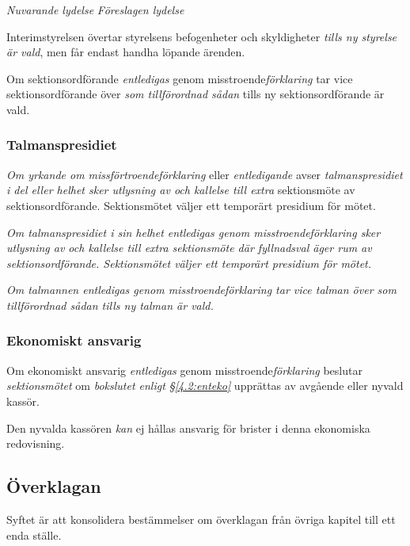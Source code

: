 \documentclass{article}
\newenvironment{lydelse}
    {\begin{paracol}{2}%
        \emph{Nuvarande lydelse}%
        \switchcolumn%
        \emph{Föreslagen lydelse}%
    \end{paracol}%
    \begin{enumerate}[label=\thesubsection.\arabic*]%
    \begin{paracol}{2}%
    }{\end{paracol}\end{enumerate}}
\begin{document}
\begin{lydelse}
    \item Interimstyrelsen övertar styrelsens befogenheter och skyldigheter \emph{tills ny styrelse är vald}, men får endast handha löpande ärenden.

    \item Om sektionsordförande \emph{entledigas} genom misstroende\emph{förklaring} tar vice sektionsordförande över \emph{som tillförordnad sådan} tills ny sektionsordförande är vald.

    \subsubsection*{Talmanspresidiet}
    \item \emph{Om yrkande om missförtroendeförklaring} eller \emph{entledigande} avser \emph{talmanspresidiet i del eller helhet sker utlysning av och kallelse till extra} sektionsmöte av sektionsordförande.
    Sektionsmötet väljer ett temporärt presidium för mötet.

    \item \emph{Om talmanspresidiet i sin helhet entledigas genom misstroendeförklaring sker utlysning av och kallelse till extra sektionsmöte där fyllnadsval äger rum av sektionsordförande.
    Sektionsmötet väljer ett temporärt presidium för mötet.}

    \item \emph{Om talmannen entledigas genom misstroendeförklaring tar vice talman över som tillförordnad sådan tills ny talman är vald.}
      
    \subsubsection*{Ekonomiskt ansvarig}
    \item Om ekonomiskt ansvarig \emph{entledigas} genom misstroende\emph{förklaring} beslutar \emph{sektionsmötet} om \emph{bokslutet enligt \S\ref{4.2:enteko}} upprättas av avgående eller nyvald kassör.

    \item Den nyvalda kassören \emph{kan} ej hållas ansvarig för brister i denna ekonomiska redovisning.

\end{lydelse}

\subsection{Överklagan}
Syftet är att konsolidera bestämmelser om överklagan från övriga kapitel till ett enda ställe.
\end{document}

